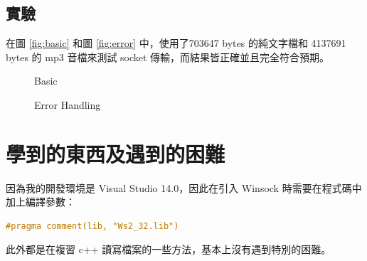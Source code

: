 \documentclass[a4paper]{article}
\begin{document}
\begin{CJK}{UTF8}{bsmi}
\subsection{實驗}
在圖 \ref{fig:basic} 和圖 \ref{fig:error} 中，使用了703647 bytes 的純文字檔和 4137691 bytes 的 mp3 音檔來測試 socket 傳輸，而結果皆正確並且完全符合預期。

\begin{figure}[h]
\caption{Basic}
\end{figure}

\begin{figure}[h]
\caption{Error Handling}
\end{figure}

\section{學到的東西及遇到的困難}
因為我的開發環境是 Visual Studio 14.0，因此在引入 Winsock 時需要在程式碼中加上編譯參數：
\begin{lstlisting}[language=c++]
#pragma comment(lib, "Ws2_32.lib")
\end{lstlisting}

此外都是在複習 c++ 讀寫檔案的一些方法，基本上沒有遇到特別的困難。
\end{CJK}
\end{document}
